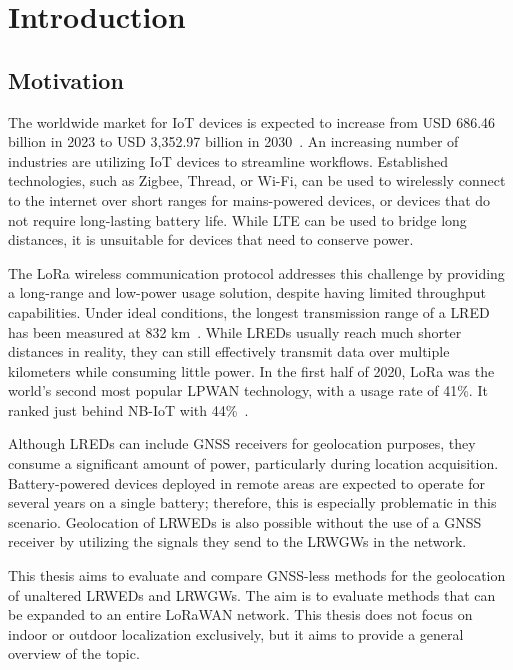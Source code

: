 \chapter{Introduction}

\section{Motivation}

The worldwide market for \ac{IoT} devices is expected to increase from USD 686.46 billion in 2023 to USD 3,352.97 billion in 2030~\cite{statista_industrial_2023}.
An increasing number of industries are utilizing \ac{IoT} devices to streamline workflows.
Established technologies, such as Zigbee, Thread, or Wi-Fi, can be used to wirelessly connect to the internet over short ranges for mains-powered devices, or devices that do not require long-lasting battery life.
While \ac{LTE} can be used to bridge long distances, it is unsuitable for devices that need to conserve power.

The \ac{LoRa} wireless communication protocol addresses this challenge by providing a long-range and low-power usage solution, despite having limited throughput capabilities.
Under ideal conditions, the longest transmission range of a \acl{LRED} has been measured at 832 km~\cite{the_things_network_global_team_lora_nodate}.
While \aclp{LRED} usually reach much shorter distances in reality, they can still effectively transmit data over multiple kilometers while consuming little power.
In the first half of 2020, \ac{LoRa} was the world's second most popular \ac{LPWAN} technology, with a usage rate of 41\%.
It ranked just behind NB-IoT with 44\%~\cite{iot_analytics_lpwa_2020}.

Although \aclp{LRED} can include \ac{GNSS} receivers for geolocation purposes, they consume a significant amount of power, particularly during location acquisition.
Battery-powered devices deployed in remote areas are expected to operate for several years on a single battery; therefore, this is especially problematic in this scenario.
Geolocation of \aclp{LRWED} is also possible without the use of a \ac{GNSS} receiver by utilizing the signals they send to the \aclp{LRWGW} in the network.

This thesis aims to evaluate and compare \ac{GNSS}-less methods for the geolocation of unaltered \aclp{LRWED} and \aclp{LRWGW}.
The aim is to evaluate methods that can be expanded to an entire \ac{LoRaWAN} network.
This thesis does not focus on indoor or outdoor localization exclusively, but it aims to provide a general overview of the topic.

